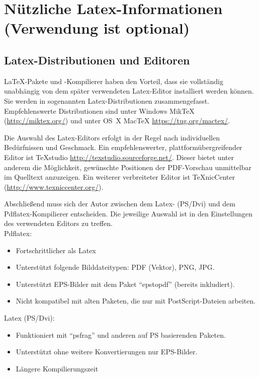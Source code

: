 \chapter[Nützliche Latex-Informationen]{Nützliche Latex-Informationen (Verwendung ist optional)}

\section{Latex-Distributionen und Editoren}

\LaTeX-Pakete und -Kompilierer haben den Vorteil, dass sie vollständig unabhängig von dem später verwendeten Latex-Editor installiert werden können. Sie werden in sogenannten Latex-Distributionen zusammengefasst. Empfehlenswerte Distributionen sind unter Windows MikTeX (\href{http://miktex.org/}{http://miktex.org/}) und unter OS~X MacTeX \href{https://tug.org/mactex/}{https://tug.org/mactex/}.

Die Auswahl des Latex-Editors erfolgt in der Regel nach individuellen Bedürfnissen und Geschmack.
Ein empfehlenswerter, plattformübergreifender Editor ist TeXstudio \href{http://texstudio.sourceforge.net/}{http://texstudio.sourceforge.net/}. Dieser bietet unter anderem die Möglichkeit, gewünschte Positionen der PDF-Vorschau unmittelbar im Quelltext anzuzeigen.
Ein weiterer verbreiteter Editor ist TeXnicCenter (\href{http://www.texniccenter.org/}{http://www.texniccenter.org/}).

Abschließend muss sich der Autor zwischen dem Latex- (PS/Dvi) und dem Pdflatex-Kompilierer entscheiden.
Die jeweilige Auswahl ist in den Einstellungen des verwendeten Editors zu treffen.\\

Pdflatex:
\begin{itemize}
	\item Fortschrittlicher als Latex
	\item Unterstützt folgende Bilddateitypen: PDF (Vektor), PNG, JPG.
	\item Unterstützt EPS-Bilder mit dem Paket "`epstopdf"' (bereits inkludiert).
	\item Nicht kompatibel mit alten Paketen, die nur mit PostScript-Dateien arbeiten.
\end{itemize}

Latex (PS/Dvi):
\begin{itemize}
	\item Funktioniert mit "`psfrag"' und anderen auf PS basierenden Paketen.
	\item Unterstützt ohne weitere Konvertierungen nur EPS-Bilder.
	\item Längere Kompilierungszeit
\end{itemize}



